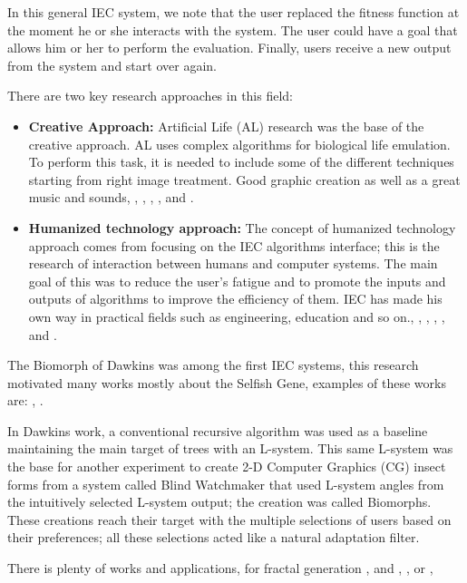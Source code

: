 In this general IEC system, we note that the user replaced the fitness function
at the moment he or she interacts with the system. The user could have a goal
that allows him or her to perform the evaluation. Finally, users receive a new
output from the system and start over again.

There are two key research approaches in this field:

\begin{itemize} \item \textbf{Creative Approach:} Artificial Life (AL) research
was the base of the creative approach. AL uses complex algorithms for biological
life emulation. To perform this task, it is needed to include some of the
different techniques starting from right image treatment. Good graphic creation
as well as a great music and sounds, \cite{sims1991artificial},
\cite{sims1994evolving}, \cite{dawkins1986blind}, \cite{disz1997ubiworld},
\cite{unemi2000sbart}and \cite{unemi2003sbeat3}. \item \textbf{Humanized
technology approach:} The concept of humanized technology approach comes from
focusing on the IEC algorithms interface; this is the research of interaction
between humans and computer systems. The main goal of this was to reduce the
user's fatigue and to promote the inputs and outputs of algorithms to improve
the efficiency of them. IEC has made his own way in practical fields such as
engineering, education and so on., \cite{parmee1993concrete},
\cite{ventrella1994explorations}, \cite{takagi1996discrete},
\cite{poli1997genetic}, \cite{parmee1998genetic} and
\cite{takagi1998interactive}. \end{itemize}

The Biomorph of Dawkins was among the first IEC systems,
this research motivated many works mostly about the Selfish Gene, examples
of these works are:  \cite{ochoa1998genetic},
\cite{mccormack1993interactive}.

In Dawkins work, a conventional recursive algorithm was used as a baseline
maintaining the main target of trees with an L-system. This same L-system was
the base for another experiment to create 2-D Computer Graphics (CG) insect
forms from a system called Blind Watchmaker that used L-system angles from the
intuitively selected L-system output; the creation was called Biomorphs. These
creations reach their target with the multiple selections of users based on
their preferences; all these selections acted like a natural adaptation filter.

There is plenty of works and applications,  for fractal generation
\cite{sims1992interactive}, \cite{baluja1993simulating} and
\cite{baluja1994towards}, \cite{lund1995artistic}, or
\cite{angeline1996evolving},\cite{raynal1999manipulation}

